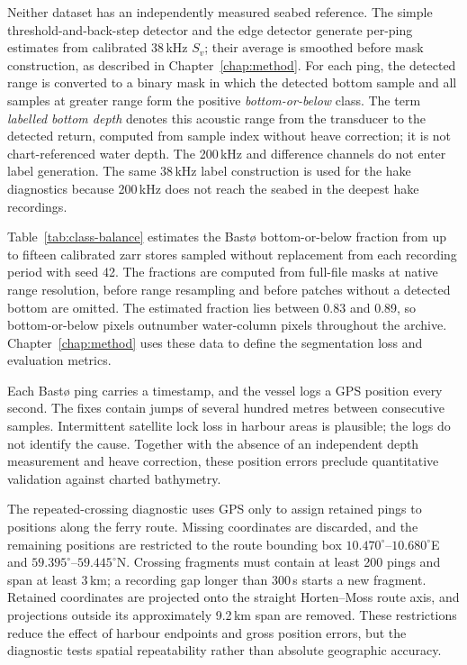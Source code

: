 Neither dataset has an independently measured seabed reference. The simple threshold-and-back-step detector and the edge detector generate per-ping estimates from calibrated 38\,kHz $S_v$; their average is smoothed before mask construction, as described in Chapter~\ref{chap:method}. For each ping, the detected range is converted to a binary mask in which the detected bottom sample and all samples at greater range form the positive \emph{bottom-or-below} class. The term \emph{labelled bottom depth} denotes this acoustic range from the transducer to the detected return, computed from sample index without heave correction; it is not chart-referenced water depth. The 200\,kHz and difference channels do not enter label generation. The same 38\,kHz label construction is used for the hake diagnostics because 200\,kHz does not reach the seabed in the deepest hake recordings.

Table~\ref{tab:class-balance} estimates the Bast\o{} bottom-or-below fraction from up to fifteen calibrated zarr stores sampled without replacement from each recording period with seed 42. The fractions are computed from full-file masks at native range resolution, before range resampling and before patches without a detected bottom are omitted. The estimated fraction lies between 0.83 and 0.89, so bottom-or-below pixels outnumber water-column pixels throughout the archive. Chapter~\ref{chap:method} uses these data to define the segmentation loss and evaluation metrics.



Each Bast\o{} ping carries a timestamp, and the vessel logs a GPS position every second. The fixes contain jumps of several hundred metres between consecutive samples. Intermittent satellite lock loss in harbour areas is plausible; the logs do not identify the cause. Together with the absence of an independent depth measurement and heave correction, these position errors preclude quantitative validation against charted bathymetry.

The repeated-crossing diagnostic uses GPS only to assign retained pings to positions along the ferry route. Missing coordinates are discarded, and the remaining positions are restricted to the route bounding box $10.470^\circ$--$10.680^\circ$E and $59.395^\circ$--$59.445^\circ$N. Crossing fragments must contain at least 200 pings and span at least 3\,km; a recording gap longer than 300\,s starts a new fragment. Retained coordinates are projected onto the straight Horten--Moss route axis, and projections outside its approximately 9.2\,km span are removed. These restrictions reduce the effect of harbour endpoints and gross position errors, but the diagnostic tests spatial repeatability rather than absolute geographic accuracy.

